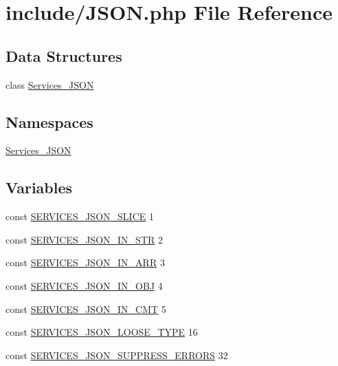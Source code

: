 \hypertarget{_j_s_o_n_8php}{\section{include/\+J\+S\+O\+N.php File Reference}
\label{_j_s_o_n_8php}
}
\subsection*{Data Structures}
\begin{DoxyCompactItemize}
\item 
class \hyperlink{class_services___j_s_o_n}{Services\+\_\+\+J\+S\+O\+N}
\end{DoxyCompactItemize}
\subsection*{Namespaces}
\begin{DoxyCompactItemize}
\item 
 \hyperlink{namespace_services___j_s_o_n}{Services\+\_\+\+J\+S\+O\+N}
\end{DoxyCompactItemize}
\subsection*{Variables}
\begin{DoxyCompactItemize}
\item 
const \hyperlink{_j_s_o_n_8php_a1e79ff1fd74e07c4ccdcd0b80e43ea04}{S\+E\+R\+V\+I\+C\+E\+S\+\_\+\+J\+S\+O\+N\+\_\+\+S\+L\+I\+C\+E} 1
\item 
const \hyperlink{_j_s_o_n_8php_ab05e1b32faca0c11f3843141c2e89f40}{S\+E\+R\+V\+I\+C\+E\+S\+\_\+\+J\+S\+O\+N\+\_\+\+I\+N\+\_\+\+S\+T\+R} 2
\item 
const \hyperlink{_j_s_o_n_8php_a800e29918ef4103a764768fd9fba3f76}{S\+E\+R\+V\+I\+C\+E\+S\+\_\+\+J\+S\+O\+N\+\_\+\+I\+N\+\_\+\+A\+R\+R} 3
\item 
const \hyperlink{_j_s_o_n_8php_a3c58eb6f6956ee76d47965de616827a3}{S\+E\+R\+V\+I\+C\+E\+S\+\_\+\+J\+S\+O\+N\+\_\+\+I\+N\+\_\+\+O\+B\+J} 4
\item 
const \hyperlink{_j_s_o_n_8php_a6061c244fdf8c7c5d6423814af6ecb07}{S\+E\+R\+V\+I\+C\+E\+S\+\_\+\+J\+S\+O\+N\+\_\+\+I\+N\+\_\+\+C\+M\+T} 5
\item 
const \hyperlink{_j_s_o_n_8php_a05615b32a21d38e71227831a102e0275}{S\+E\+R\+V\+I\+C\+E\+S\+\_\+\+J\+S\+O\+N\+\_\+\+L\+O\+O\+S\+E\+\_\+\+T\+Y\+P\+E} 16
\item 
const \hyperlink{_j_s_o_n_8php_ae614918331d7f14a4da9de624af7df33}{S\+E\+R\+V\+I\+C\+E\+S\+\_\+\+J\+S\+O\+N\+\_\+\+S\+U\+P\+P\+R\+E\+S\+S\+\_\+\+E\+R\+R\+O\+R\+S} 32
\end{DoxyCompactItemize}


